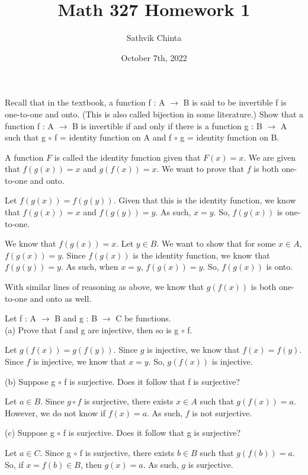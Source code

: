 \documentclass[addpoints]{exam}
\title{Math 327 Homework 1}
\author{Sathvik Chinta}
\date{October 7th, 2022}
\begin{document}
\maketitle

\begin{questions}
\question Recall that in the textbook, a function f : A $\rightarrow$ B is said to be
invertible f is one-to-one and onto. (This is also called bijection in some literature.)
Show that a function f : A $\rightarrow$ B is invertible if and only if there is a function g :
B $\rightarrow$ A such that g $\circ$ f = identity function on A and f $\circ$ g = identity 
function on B.

A function $F$ is called the identity function given that $F(x) = x$. We are given that $f(g(x)) 
= x$ and $g(f(x)) = x$. We want to prove that $f$ is both one-to-one and onto. 

Let $f(g(x)) = f(g(y))$. Given that this is the identity function, we know that $f(g(x)) = x$ 
and $f(g(y)) = y$. As such, $x = y$. So, $f(g(x))$ is one-to-one. 

We know that $f(g(x)) = x$. Let $y \in B$. We want to show that for some $x \in A$, $f(g(x)) = y$.
Since $f(g(x))$ is the identity function, we know that $f(g(y)) = y$. As such, when $x = y$, 
$f(g(x)) = y$. So, $f(g(x))$ is onto.

With similar lines of reasoning as above, we know that $g(f(x))$ is both one-to-one and onto as well. 



\question Let f : A $\rightarrow$ B and g : B $\rightarrow$ C be functions.\\
(a) Prove that f and g are injective, then so is g $\circ$ f. 

Let $g(f(x)) = g(f(y))$. Since $g$ is injective, we know that $f(x) = f(y)$. Since $f$ is injective,
we know that $x = y$. So, $g(f(x))$ is injective.

(b) Suppose g $\circ$ f is surjective. Does it follow that f is surjective?

Let $a \in B$. Since $g \circ f$ is surjective, there exists $x \in A$ such that $g(f(x)) = a$. However, 
we do not know if $f(x) = a$. As such, $f$ is not surjective. 

(c) Suppose g $\circ$ f is surjective. Does it follow that g is surjective?

Let $a \in C$. Since g $\circ$ f is surjective, there exists $b \in B$ such that $g(f(b)) = a$. So, 
if $x = f(b) \in B$, then $g(x) = a$. As such, $g$ is surjective.


\end{questions}
\end{document}
